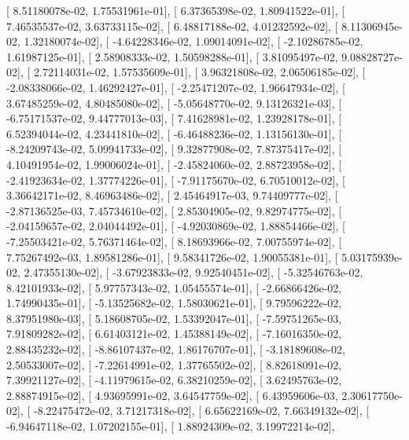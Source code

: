 \documentclass{article}
\begin{document}
       [  8.51180078e-02,   1.75531961e-01],
       [  6.37365398e-02,   1.80941522e-01],
       [  7.46535537e-02,   3.63733115e-02],
       [  6.48817188e-02,   4.01232592e-02],
       [  8.11306945e-02,   1.32180074e-02],
       [ -4.64228346e-02,   1.09014091e-02],
       [ -2.10286785e-02,   1.61987125e-01],
       [  2.58908333e-02,   1.50598288e-01],
       [  3.81095497e-02,   9.08828727e-02],
       [  2.72114031e-02,   1.57535609e-01],
       [  3.96321808e-02,   2.06506185e-02],
       [ -2.08338066e-02,   1.46292427e-01],
       [ -2.25471207e-02,   1.96647934e-02],
       [  3.67485259e-02,   4.80485080e-02],
       [ -5.05648770e-02,   9.13126321e-03],
       [ -6.75171537e-02,   9.44777013e-03],
       [  7.41628981e-02,   1.23928178e-01],
       [  6.52394044e-02,   4.23441810e-02],
       [ -6.46488236e-02,   1.13156130e-01],
       [ -8.24209743e-02,   5.09941733e-02],
       [  9.32877908e-02,   7.87375417e-02],
       [  4.10491954e-02,   1.99006024e-01],
       [ -2.45824060e-02,   2.88723958e-02],
       [ -2.41923634e-02,   1.37774226e-01],
       [ -7.91175670e-02,   6.70510012e-02],
       [  3.36642171e-02,   8.46963486e-02],
       [  2.45464917e-03,   9.74409777e-02],
       [ -2.87136525e-03,   7.45734610e-02],
       [  2.85304905e-02,   9.82974775e-02],
       [ -2.04159657e-02,   2.04044492e-01],
       [ -4.92030869e-02,   1.88854466e-02],
       [ -7.25503421e-02,   5.76371464e-02],
       [  8.18693966e-02,   7.00755974e-02],
       [  7.75267492e-03,   1.89581286e-01],
       [  9.58341726e-02,   1.90055381e-01],
       [  5.03175939e-02,   2.47355130e-02],
       [ -3.67923833e-02,   9.92540451e-02],
       [ -5.32546763e-02,   8.42101933e-02],
       [  5.97757343e-02,   1.05455574e-01],
       [ -2.66866426e-02,   1.74990435e-01],
       [ -5.13525682e-02,   1.58030621e-01],
       [  9.79596222e-02,   8.37951980e-03],
       [  5.18608705e-02,   1.53392047e-01],
       [ -7.59751265e-03,   7.91809282e-02],
       [  6.61403121e-02,   1.45388149e-02],
       [ -7.16016350e-02,   2.88435232e-02],
       [ -8.86107437e-02,   1.86176707e-01],
       [ -3.18189608e-02,   2.50533007e-02],
       [ -7.22614991e-02,   1.37765502e-02],
       [  8.82618091e-02,   7.39921127e-02],
       [ -4.11979615e-02,   6.38210259e-02],
       [  3.62495763e-02,   2.88874915e-02],
       [  4.93695991e-02,   3.64547759e-02],
       [  6.43959606e-03,   2.30617750e-02],
       [ -8.22475472e-02,   3.71217318e-02],
       [  6.65622169e-02,   7.66349132e-02],
       [ -6.94647118e-02,   1.07202155e-01],
       [  1.88924309e-02,   3.19972214e-02],
\end{document}
